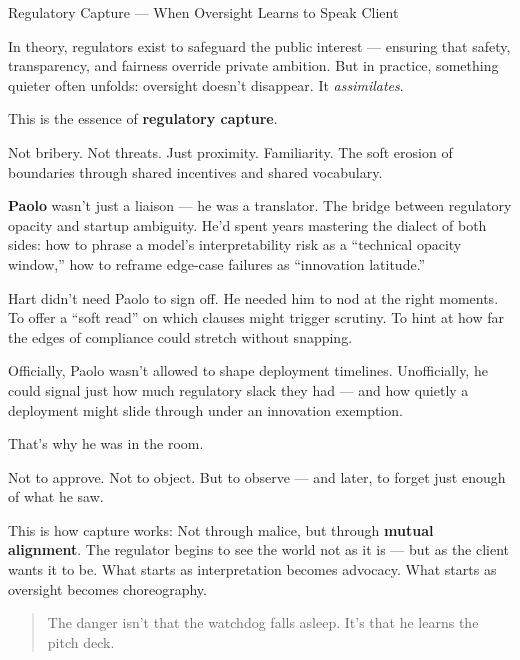 \begin{PhilosophicalSidebar}{Regulatory Capture — When Oversight Learns to Speak Client}

  In theory, regulators exist to safeguard the public interest — ensuring that safety, transparency, and fairness 
  override private ambition.  
  But in practice, something quieter often unfolds: oversight doesn’t disappear. It \textit{assimilates}.  

  \medskip
  
  This is the essence of \textbf{regulatory capture}.

  \medskip
  
  Not bribery. Not threats.  
  Just proximity. Familiarity. The soft erosion of boundaries through shared incentives and shared vocabulary.
  
  \medskip
  
  \textbf{Paolo} wasn’t just a liaison — he was a translator.  
  The bridge between regulatory opacity and startup ambiguity.  
  He’d spent years mastering the dialect of both sides: how to phrase a model’s interpretability risk as a “technical 
  opacity window,” how to reframe edge-case failures as “innovation latitude.”
  
  \medskip
  
  Hart didn’t need Paolo to sign off.  
  He needed him to nod at the right moments.  
  To offer a “soft read” on which clauses might trigger scrutiny.  
  To hint at how far the edges of compliance could stretch without snapping.
  
  \medskip
  
  Officially, Paolo wasn’t allowed to shape deployment timelines.  
  Unofficially, he could signal just how much regulatory slack they had — and how quietly a deployment might slide 
  through under an innovation exemption.

  \medskip
  
  That’s why he was in the room.

  \medskip
  
  Not to approve.  
  Not to object.  
  But to observe — and later, to forget just enough of what he saw.
  
  \medskip
  
  This is how capture works:  
  Not through malice, but through \textbf{mutual alignment}.  
  The regulator begins to see the world not as it is — but as the client wants it to be.  
  What starts as interpretation becomes advocacy.  
  What starts as oversight becomes choreography.
  
  \begin{quote}
  The danger isn’t that the watchdog falls asleep.  
  It’s that he learns the pitch deck.
  \end{quote}
  
\end{PhilosophicalSidebar}

